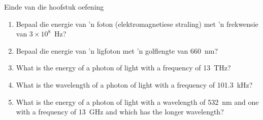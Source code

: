 \begin{eocexercises}{Einde van die hoofstuk oefening}
\begin{enumerate}[noitemsep, label=\textbf{\arabic*}. ] 
    \item Bepaal die energie van 'n foton (e\-lek\-tro\-mag\-ne\-tie\-se straling) met 'n frekwensie van $3\ensuremath{\times}{10}^{8}$~Hz?\newline
    \item Bepaal die energie van 'n ligfoton met 'n golflengte van 660~nm?\newline

\item What is the energy of a photon of light with a frequency of 13~THz?\newline

\item What is the wavelength of a photon of light with a frequency of 101.3~kHz?\newline

\item What is the energy of a photon of light with a wavelength of 532~nm and one with a frequency of 13~GHz and which has the longer wavelength?\newline


\end{enumerate}
\end{eocexercises}
